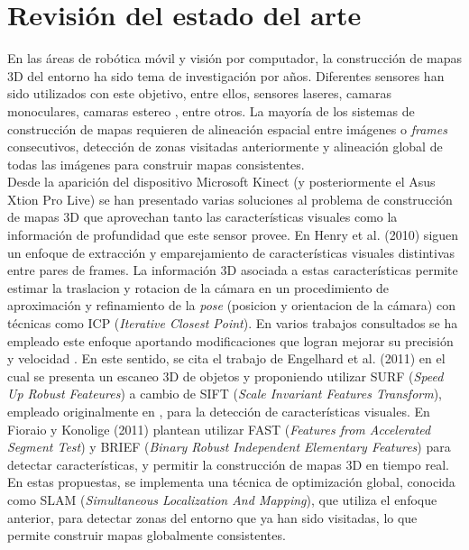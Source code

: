 \chapter{Revisión del estado del arte}
\label{cap:estado-del-arte}

En las áreas de robótica móvil y visión por computador, la construcción de mapas 3D del entorno ha sido tema de investigación por años. Diferentes sensores han sido utilizados con este objetivo, entre ellos, sensores laseres\cite{chou2013robotic}\cite{Montemerlo02fastslam}, camaras monoculares\cite{tomono2009robust}\cite{clemente_etal_rss2007}, camaras estereo \cite{Mei11}\cite{Konolige08}, entre otros. La mayoría de los sistemas de construcción de mapas requieren de alineación espacial entre imágenes o \textit{frames} consecutivos, detección de zonas visitadas anteriormente y alineación global de todas las imágenes para construir mapas consistentes. \\

Desde la aparición del dispositivo Microsoft Kinect (y posteriormente el Asus Xtion Pro Live\cite{asus-xtion-pro-live}) se han presentado varias soluciones al problema de construcción de mapas 3D que aprovechan tanto las características visuales como la información de profundidad que este sensor provee. En Henry et al. (2010)\cite{henry2010rgb} siguen un enfoque de extracción y emparejamiento de características visuales distintivas entre pares de frames. La información 3D asociada a estas características permite estimar la traslacion y rotacion de la cámara en un procedimiento de aproximación y refinamiento de la \textit{pose} (posicion y orientacion de la cámara) con técnicas como ICP (\textit{Iterative Closest Point})\cite{Besl92}. En varios trabajos consultados se ha empleado este enfoque aportando modificaciones que logran mejorar su precisión y velocidad \cite{engelhard2011real}\cite{hogmanbuilding}\cite{fioraio2011realtime}\cite{6614623}. En este sentido, se cita el trabajo de Engelhard et al. (2011)\cite{engelhard2011real} en el cual se presenta un escaneo 3D de objetos y proponiendo utilizar SURF (\textit{Speed Up Robust Feateures}) \cite{bay2008speeded} a cambio de SIFT (\textit{Scale Invariant Features Transform}), empleado originalmente en \cite{henry2010rgb}, para la detección de características visuales. En Fioraio y Konolige (2011)\cite{fioraio2011realtime} plantean utilizar FAST (\textit{Features from Accelerated Segment Test})\cite{Rosten06machinelearning} y BRIEF (\textit{Binary Robust Independent Elementary Features})\cite{Calonder12} para detectar características, y permitir la construcción de mapas 3D en tiempo real. En estas propuestas, se implementa una técnica de optimización global, conocida como SLAM (\textit{Simultaneous Localization And Mapping}), que utiliza el enfoque anterior, para detectar zonas del entorno que ya han sido visitadas, lo que permite construir mapas globalmente consistentes. \\

